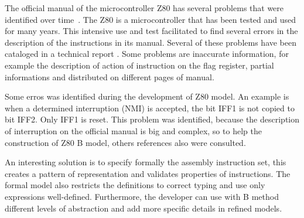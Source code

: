\documentclass[11pt]{article} %
\begin{document}
The official manual of the microcontroller Z80 \cite{Z80_manual} has several
problems that were identified over time~\cite{UndocumentedZ80}. The Z80 is a
microcontroller that  has been tested and used for many years. This intensive use
and test facilitated to find several errors in the description of the
instructions in its manual. Several of these problems have been cataloged in a
technical report \cite{UndocumentedZ80}. Some problems are inaccurate
information, for example the description of action of instruction on the flag
register, partial informations and distributed on different pages of manual.


Some erros was identified during the development of Z80 model.
An example is
when a determined interruption (NMI) is accepted, the bit IFF1 is not
copied to bit IFF2. %
Only IFF1 is reset. This problem was identified, because the description of
interruption on the official manual is big and complex, so to help the
construction of Z80 B model, others references  \cite{UndocumentedZ80,Simulator_z80} 
also were consulted.
  

An interesting solution is to specify formally the assembly instruction set,
this creates a pattern of representation and validates properties of
instructions. The formal model also restricts the definitions to correct typing and use only
expressions well-defined.
Furthermore, the developer can use with B method different levels of
abstraction and add more specific details in refined models. 
 

\end{document}
